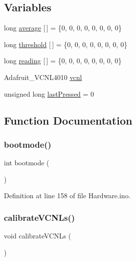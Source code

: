 \subsection*{Variables}
\begin{DoxyCompactItemize}
\item 
long \mbox{\hyperlink{_hardware_8ino_a23fc805921fc5a0002591c4189b52b1d}{average}} \mbox{[}$\,$\mbox{]} = \{0, 0, 0, 0, 0, 0, 0, 0\}
\item 
long \mbox{\hyperlink{_hardware_8ino_ac32fe680767b975eb3dcffe87f347a85}{threshold}} \mbox{[}$\,$\mbox{]} = \{0, 0, 0, 0, 0, 0, 0, 0\}
\item 
long \mbox{\hyperlink{_hardware_8ino_ab219875e305edef08cd33f81d004c80a}{reading}} \mbox{[}$\,$\mbox{]} = \{0, 0, 0, 0, 0, 0, 0, 0\}
\item 
Adafruit\+\_\+\+V\+C\+N\+L4010 \mbox{\hyperlink{_hardware_8ino_af8997547c94d8bb6ee460b3538e4cd11}{vcnl}}
\item 
unsigned long \mbox{\hyperlink{_hardware_8ino_ac725663f0bb1d8d2b904d4440bcc38d1}{last\+Pressed}} = 0
\end{DoxyCompactItemize}


\subsection{Function Documentation}
\mbox{\label{_hardware_8ino_a5d34488889bea2a689fec065f2a1a063}} 
\subsubsection{\texorpdfstring{bootmode()}{bootmode()}}
{\footnotesize\ttfamily int bootmode (\begin{DoxyParamCaption}{ }\end{DoxyParamCaption})}



Definition at line 158 of file Hardware.\+ino.

\mbox{\label{_hardware_8ino_ab465fde968855441f09ae803a25261a8}} 
\subsubsection{\texorpdfstring{calibrateVCNLs()}{calibrateVCNLs()}}
{\footnotesize\ttfamily void calibrate\+V\+C\+N\+Ls (\begin{DoxyParamCaption}{ }\end{DoxyParamCaption})}



